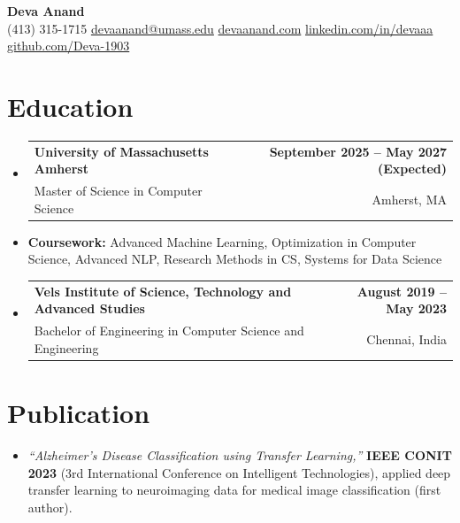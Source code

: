 \documentclass[letterpaper,10pt]{article}
\makeatletter
\newcommand{\resumeSubheading}[4]{
  \vspace{1pt}\item
    \begin{tabular*}{0.985\textwidth}[t]{l@{\extracolsep{\fill}}r}
      \textbf{#1} & \textbf{\small #2} \\
      {\small\color{ResumeSlate} #3} & {\small\color{ResumeSlate} #4} \\
    \end{tabular*}\vspace{-6pt}
}
\newcommand{\resumeSubItem}[1]{\item[]\small{#1\vspace{-1pt}}}
\newcommand{\resumeSubHeadingListStart}{\begin{itemize}[leftmargin=0.0in, label={}, itemsep=2pt, topsep=2pt]}
\newcommand{\resumeSubHeadingListEnd}{\end{itemize}}
\makeatother
\begin{document}
\begin{center}
    {\LARGE \bfseries \textcolor{ResumeNavy}{Deva Anand}} \\ \vspace{4pt}
    \small
    (413) 315-1715 \enspace\textbar\enspace
    \href{mailto:devaanand@umass.edu}{devaanand@umass.edu} \enspace\textbar\enspace
    \href{https://devaanand.com}{devaanand.com} \enspace\textbar\enspace
    \href{https://linkedin.com/in/devaaa/}{linkedin.com/in/devaaa} \enspace\textbar\enspace
    \href{https://github.com/Deva-1903}{github.com/Deva-1903}
    \vspace{-6pt}
\end{center}
\section{Education}
\resumeSubHeadingListStart
  \resumeSubheading
    {University of Massachusetts Amherst}{September 2025 -- May 2027 (Expected)}
    {Master of Science in Computer Science}{Amherst, MA}
  \resumeSubItem{\textbf{Coursework:} Advanced Machine Learning, Optimization in Computer Science, Advanced NLP, Research Methods in CS, Systems for Data Science}
  \resumeSubheading
    {Vels Institute of Science, Technology and Advanced Studies}{August 2019 -- May 2023}
    {Bachelor of Engineering in Computer Science and Engineering}{Chennai, India}
\resumeSubHeadingListEnd
\vspace{-4pt}
\section{Publication}
\begin{itemize}[leftmargin=0.18in, itemsep=0pt, topsep=1pt]
  \item\small \textit{``Alzheimer's Disease Classification using Transfer Learning,''} \textbf{IEEE CONIT 2023} (3rd International Conference on Intelligent Technologies), applied deep transfer learning to neuroimaging data for medical image classification (first author).
\end{itemize}
\vspace{-4pt}
\end{document}
